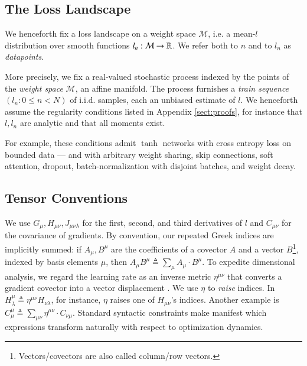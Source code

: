 \documentclass{article}
\theoremstyle{plain}
\theoremstyle{definition}
\newcommand{\Mm}{\mathcal{M}}
\begin{document}
    \subsection{The Loss Landscape}
        We henceforth fix a loss landscape on a weight space $\Mm$, i.e. a
        mean-$l$ distribution over smooth functions $l_n:\Mm\to\RR$.
        We refer both to $n$ and to $l_n$ as \emph{datapoints}.

        More precisely, we fix a real-valued stochastic process indexed by the
        points of the \emph{weight space} $\Mm$, an affine manifold.  The
        process furnishes a \emph{train sequence} $(l_n: 0\leq n<N)$ of i.i.d.
        samples, each an unbiased estimate of $l$. We henceforth assume the
        regularity conditions listed in Appendix \ref{sect:proofs}, for
        instance that $l, l_n$ are analytic and that all moments exist.

        For example, these conditions admit $\tanh$ networks with cross entropy
        loss on bounded data --- and with arbitrary weight sharing, skip
        connections, soft attention, dropout, batch-normalization with disjoint
        batches, and weight decay.
        

    \subsection{Tensor Conventions}
        We use $G_\mu, H_{\mu\nu}, J_{\mu\nu\lambda}$ for the first, second,
        and third derivatives of $l$ and $C_{\mu \nu}$ for the covariance of
        gradients.  By convention, our repeated Greek indices are implicitly
        summed: if $A_\mu, B^\mu$ are the coefficients of a covector $A$ and a
        vector
        $B$\footnote{
            Vectors/covectors are also called column/row vectors.
        }, indexed by basis elements $\mu$, then
        $
            A_\mu B^\mu
            \triangleq
            \sum_\mu A_\mu \cdot B^\mu
        $.
        To expedite dimensional analysis, we regard the learning rate as an
        inverse metric $\eta^{\mu\nu}$ that converts a gradient covector into a
        vector displacement \citep{bo13}.  We use $\eta$ to \emph{raise}
        indices.  In
        $
            H^{\mu}_{\lambda}
            \triangleq
            \eta^{\mu\nu} H_{\nu\lambda}
        $, for instance,
        $\eta$ raises one of $H_{\mu\nu}$'s indices.  Another example is
        $
            C^{\mu}_{\mu}
            \triangleq
            \sum_{\mu \nu} \eta^{\mu\nu} \cdot C_{\nu\mu}
        $.
        Standard syntactic constraints make manifest which expressions
        transform naturally with respect to optimization dynamics.  
\end{document}
